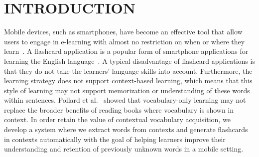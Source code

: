 \documentclass[sigchi]{acmart}
\begin{document}


\begin{comment}
\begin{teaserfigure}
  \texttt{[image: sampleteaser]}
  \caption{Seattle Mariners at Spring Training, 2010.}
  \Description{Enjoying the baseball game from the third-base
  seats. Ichiro Suzuki preparing to bat.}
  \label{fig:teaser}
\end{teaserfigure}
\end{comment}
\maketitle

\section{INTRODUCTION}
Mobile devices, such as smartphones, have become an effective tool that allow users to engage in e-learning with almost no restriction on when or where they learn~\cite{anaraki2009flash,basoglu2010comparison}. A flashcard application is a popular form of smartphone applications for learning the English language~\cite{klimova2018evaluation}. A typical disadvantage of flashcard applications is that they do not take the learners' language skills into account. Furthermore, the learning strategy does not support context-based learning, which means that this style of learning may not support memorization or understanding of these words within sentences. Pollard et al.~\cite{pollard2018effects} showed that vocabulary-only learning may not replace the broader benefits of reading books where vocabulary is shown in context. In order retain the value of contextual vocabulary acquisition, we develop a system where we extract words from contexts and generate flashcards in contexts automatically with the goal of helping learners improve their understanding and retention of previously unknown words in a mobile setting. 
\end{document}
